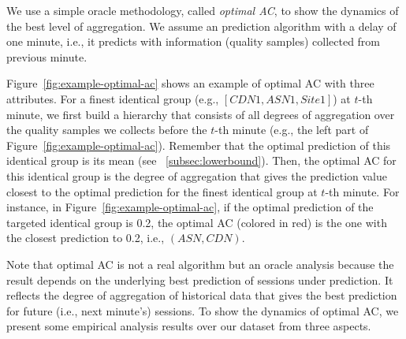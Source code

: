 We use a simple oracle methodology, called {\it optimal AC}, to show the dynamics of the best level of aggregation. We assume an prediction algorithm with a delay of one minute, i.e., it predicts with information (quality samples) collected from previous minute.

Figure~\ref{fig:example-optimal-ac} shows an example of optimal AC with three attributes. For a finest identical group (e.g., $[CDN1,ASN1,Site1]$) at $t$-th minute, we first build a hierarchy that consists of all degrees of aggregation over the quality samples we collects before the $t$-th minute (e.g., the left part of Figure~\ref{fig:example-optimal-ac}). 
Remember that the optimal prediction of this identical group is its mean (see \Section~\ref{subsec:lowerbound}). 
Then, the optimal AC for this identical group is the degree of aggregation that gives the prediction value closest to the optimal prediction for the finest identical group at $t$-th minute. 
For instance, in Figure~\ref{fig:example-optimal-ac}, if the optimal prediction of the targeted identical group is 0.2, the optimal AC (colored in red) is the one with the closest prediction to 0.2, i.e., $(ASN, CDN)$. 

Note that optimal AC is not a real algorithm but an oracle analysis because the result depends on the underlying best prediction of sessions under prediction. It reflects the degree of aggregation of historical data that gives the best prediction for future (i.e., next minute's) sessions.
To show the dynamics of optimal AC, we present some empirical analysis results over our dataset from three aspects. 

